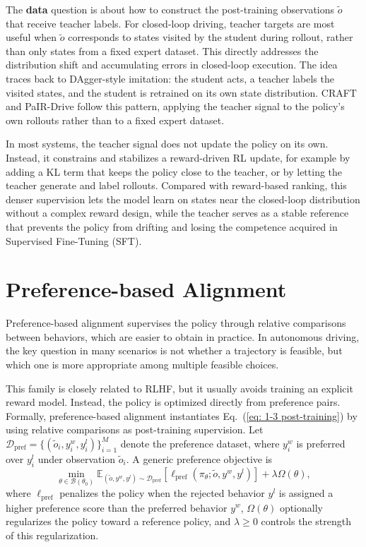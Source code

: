 \documentclass[runningheads]{llncs}
\begin{document}
The \textbf{data} question is about how to construct the post-training observations \(\tilde{o}\) that receive teacher labels. For closed-loop driving, teacher targets are most useful when \(\tilde{o}\) corresponds to states visited by the student during rollout, rather than only states from a fixed expert dataset. This directly addresses the distribution shift and accumulating errors in closed-loop execution. The idea traces back to DAgger-style imitation: the student acts, a teacher labels the visited states, and the student is retrained on its own state distribution. CRAFT and PaIR-Drive follow this pattern, applying the teacher signal to the policy's own rollouts rather than to a fixed expert dataset.

In most systems, the teacher signal does not update the policy on its own. Instead, it constrains and stabilizes a reward-driven RL update, for example by adding a KL term that keeps the policy close to the teacher, or by letting the teacher generate and label rollouts. Compared with reward-based ranking, this denser supervision lets the model learn on states near the closed-loop distribution without a complex reward design, while the teacher serves as a stable reference that prevents the policy from drifting and losing the competence acquired in Supervised Fine-Tuning (SFT).


\section{Preference-based Alignment}
\label{sec:preference}

Preference-based alignment supervises the policy through relative comparisons between behaviors, which are easier to obtain in practice.
In autonomous driving, the key question in many scenarios is not whether a trajectory is feasible, but which one is more appropriate among multiple feasible choices. 

This family is closely related to RLHF, but it usually avoids training an explicit reward model. Instead, the policy is optimized directly from preference pairs. 
Formally, preference-based alignment instantiates Eq.~(\ref{eq: 1-3 post-training}) by using relative comparisons as post-training supervision. Let $\mathcal{D}_{\mathrm{pref}}=\{(\tilde{o}_i,y_i^w,y_i^l)\}_{i=1}^{M}$ denote the preference dataset, where $y_i^w$ is preferred over $y_i^l$ under observation $\tilde{o}_i$. A generic preference objective is
\begin{equation}
\min_{\theta \in \mathcal{B}(\theta_0)}
\mathbb{E}_{(\tilde{o},y^w,y^l)\sim \mathcal{D}_{\mathrm{pref}}}
\left[
\ell_{\mathrm{pref}}
\left(
\pi_\theta; \tilde{o}, y^w, y^l
\right)
\right]
+
\lambda\Omega(\theta),
\label{eq:preference_post_training}
\end{equation}
where $\ell_{\mathrm{pref}}$ penalizes the policy when the rejected behavior $y^l$ is assigned a higher preference score than the preferred behavior $y^w$, $\Omega(\theta)$ optionally regularizes the policy toward a reference policy, and $\lambda\ge 0$ controls the strength of this regularization. 
\end{document}

